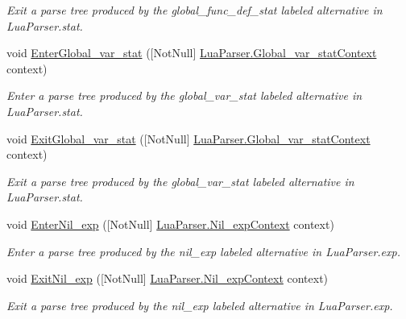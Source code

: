 \begin{DoxyCompactItemize}
\begin{DoxyCompactList}\small\item\em Exit a parse tree produced by the {\ttfamily global\+\_\+func\+\_\+def\+\_\+stat} labeled alternative in Lua\+Parser.\+stat. \end{DoxyCompactList}\item 
void \mbox{\hyperlink{interfacezlua_1_1_i_lua_listener_a7a5992193e5625f3c6d07fcc05f3ce4c}{Enter\+Global\+\_\+var\+\_\+stat}} (\mbox{[}Not\+Null\mbox{]} \mbox{\hyperlink{classzlua_1_1_lua_parser_1_1_global__var__stat_context}{Lua\+Parser.\+Global\+\_\+var\+\_\+stat\+Context}} context)
\begin{DoxyCompactList}\small\item\em Enter a parse tree produced by the {\ttfamily global\+\_\+var\+\_\+stat} labeled alternative in Lua\+Parser.\+stat. \end{DoxyCompactList}\item 
void \mbox{\hyperlink{interfacezlua_1_1_i_lua_listener_a4e14ac8afc7b39056fc78c89ac3ba8fa}{Exit\+Global\+\_\+var\+\_\+stat}} (\mbox{[}Not\+Null\mbox{]} \mbox{\hyperlink{classzlua_1_1_lua_parser_1_1_global__var__stat_context}{Lua\+Parser.\+Global\+\_\+var\+\_\+stat\+Context}} context)
\begin{DoxyCompactList}\small\item\em Exit a parse tree produced by the {\ttfamily global\+\_\+var\+\_\+stat} labeled alternative in Lua\+Parser.\+stat. \end{DoxyCompactList}\item 
void \mbox{\hyperlink{interfacezlua_1_1_i_lua_listener_aafcaca4386184948c08ead3b5dbba3be}{Enter\+Nil\+\_\+exp}} (\mbox{[}Not\+Null\mbox{]} \mbox{\hyperlink{classzlua_1_1_lua_parser_1_1_nil__exp_context}{Lua\+Parser.\+Nil\+\_\+exp\+Context}} context)
\begin{DoxyCompactList}\small\item\em Enter a parse tree produced by the {\ttfamily nil\+\_\+exp} labeled alternative in Lua\+Parser.\+exp. \end{DoxyCompactList}\item 
void \mbox{\hyperlink{interfacezlua_1_1_i_lua_listener_a7b5aa1a0b4e1441c884028a324f69439}{Exit\+Nil\+\_\+exp}} (\mbox{[}Not\+Null\mbox{]} \mbox{\hyperlink{classzlua_1_1_lua_parser_1_1_nil__exp_context}{Lua\+Parser.\+Nil\+\_\+exp\+Context}} context)
\begin{DoxyCompactList}\small\item\em Exit a parse tree produced by the {\ttfamily nil\+\_\+exp} labeled alternative in Lua\+Parser.\+exp. \end{DoxyCompactList}\item 

\end{DoxyCompactItemize}
